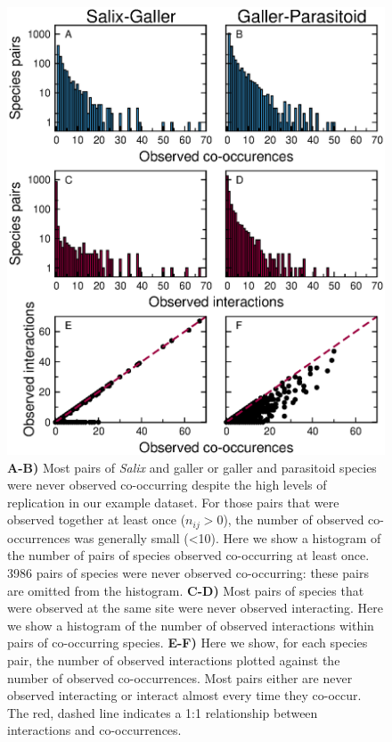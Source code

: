 \documentclass[12pt]{article}
\begin{document}
    \begin{figure}
      \caption{\textbf{A-B)} Most pairs of \emph{Salix} and galler or galler and parasitoid species were never observed co-occurring despite the high levels of replication in our example dataset. For those pairs that were observed together at least once ($n_{ij}>0$), the number of observed co-occurrences was generally small (\textless10). Here we show a histogram of the number of pairs of species observed co-occurring at least once. 3986 pairs of species were never observed co-occurring: these pairs are omitted from the histogram. \textbf{C-D)} Most pairs of species that were observed at the same site were never observed interacting. Here we show a histogram of the number of observed interactions within pairs of co-occurring species. \textbf{E-F)} Here we show, for each species pair, the number of observed interactions plotted against the number of observed co-occurrences. Most pairs either are never observed interacting or interact almost every time they co-occur. The red, dashed line indicates a 1:1 relationship between interactions and co-occurrences.}
      \label{histograms}
      \includegraphics*[width=.8\textwidth]{figures/Salix_Galler_histogram.eps}
      \end{figure}

\end{document}

